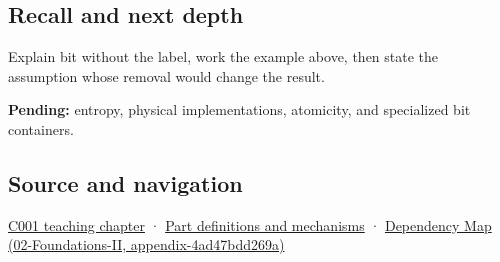 \subsection{Recall and next depth}\label{recall-and-next-depth}

Explain bit without the label, work the example above, then state the assumption whose removal would change the result.

\textbf{Pending:} entropy, physical implementations, atomicity, and specialized bit containers.

\subsection{Source and navigation}\label{source-and-navigation}

\href{Continuous\%20Notes/Computing\%20Foundations\%20-\%20From\%20Bits\%20to\%20C++\%20and\%20Systems\%20APIs\#From\%20a\%20signal\%20to\%20an\%20interpretation}{C001 teaching chapter} · \hyperref[appendix-fd090d982a15]{Part definitions and mechanisms} · \href{}{Dependency Map (02-Foundations-II, appendix-4ad47bdd269a)}
